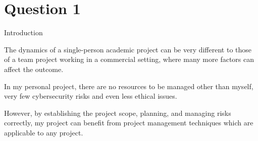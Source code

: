 \documentclass[11pt]{article}
\begin{document}
\section*{Question 1} 

Introduction

The dynamics of a single-person academic project can be very different to those of a team project working in a commercial setting, where many more factors can affect the outcome.

In my personal project, there are no resources to be managed other than myself, very few cybersecurity risks and even less ethical issues.

However, by establishing the project scope, planning, and managing risks correctly, my project can benefit from project management techniques which are applicable to any project.
\end{document}
